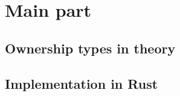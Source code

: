 \documentclass[sigplan,11pt,nonacm]{acmart}
\begin{document}






\section{Main part}
\label{sec:mainpart}


\subsection{Ownership types in theory}


\subsection{Implementation in Rust}



\end{document}
